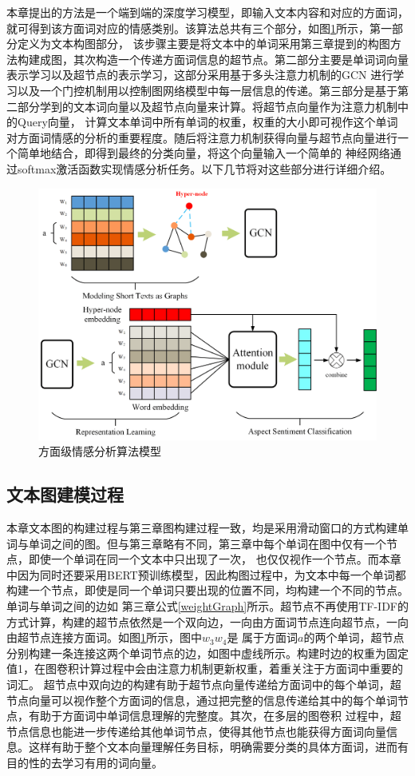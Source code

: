 本章提出的方法是一个端到端的深度学习模型，即输入文本内容和对应的方面词，就可得到该方面词对应的情感类别。该算法总共有三个部分，如图\ref{asgraphart}所示，第一部分定义为文本构图部分，
该步骤主要是将文本中的单词采用第三章提到的构图方法构建成图，其次构造一个传递方面词信息的超节点。第二部分主要是单词词向量表示学习以及超节点的表示学习，这部分采用基于多头注意力机制的GCN
进行学习以及一个门控机制用以控制图网络模型中每一层信息的传递。第三部分是基于第二部分学到的文本词向量以及超节点向量来计算。将超节点向量作为注意力机制中的Query向量，
计算文本单词中所有单词的权重，权重的大小即可视作这个单词对方面词情感的分析的重要程度。随后将注意力机制获得向量与超节点向量进行一个简单地结合，即得到最终的分类向量，将这个向量输入一个简单的
神经网络通过softmax激活函数实现情感分析任务。以下几节将对这些部分进行详细介绍。
\begin{figure}[htb]
	\setlength{\belowcaptionskip}{0pt}
	\centering
	\includegraphics[width=1\textwidth]{pic/asgraphart.png}
	\caption{方面级情感分析算法模型}
	\label{asgraphart}
\end{figure}

\subsection{文本图建模过程}
本章文本图的构建过程与第三章图构建过程一致，均是采用滑动窗口的方式构建单词与单词之间的图。但与第三章略有不同，第三章中每个单词在图中仅有一个节点，即使一个单词在同一个文本中只出现了一次，
也仅仅视作一个节点。而本章中因为同时还要采用BERT预训练模型，因此构图过程中，为文本中每一个单词都构建一个节点，即使是同一个单词只要出现的位置不同，均构建一个不同的节点。单词与单词之间的边如
第三章公式\ref{weightGraph}所示。超节点不再使用TF-IDF的方式计算，构建的超节点依然是一个双向边，一向由方面词节点连向超节点，一向由超节点连接方面词。如图\ref{asgraphart}所示，图中$w_3$$w_4$是
属于方面词$a$的两个单词，超节点分别构建一条连接这两个单词节点的边，如图中虚线所示。构建时边的权重为固定值1，在图卷积计算过程中会由注意力机制更新权重，着重关注于方面词中重要的词汇。
超节点中双向边的构建有助于超节点向量传递给方面词中的每个单词，超节点向量可以视作整个方面词的信息，通过把完整的信息传递给其中的每个单词节点，有助于方面词中单词信息理解的完整度。其次，在多层的图卷积
过程中，超节点信息也能进一步传递给其他单词节点，使得其他节点也能获得方面词向量信息。这样有助于整个文本向量理解任务目标，明确需要分类的具体方面词，进而有目的性的去学习有用的词向量。


